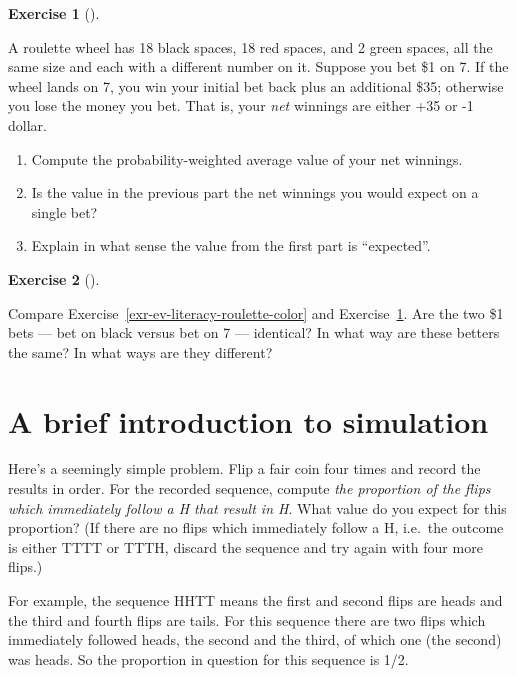 \documentclass[
  letterpaper,
  DIV=11,
  numbers=noendperiod]{scrreprt}
\providecommand{\tightlist}{%
  \setlength{\itemsep}{0pt}\setlength{\parskip}{0pt}}
\theoremstyle{plain}
\theoremstyle{definition}
\theoremstyle{definition}
\newtheorem{exercise}{Exercise}[chapter]
\theoremstyle{definition}
\theoremstyle{remark}
\begin{document}
\begin{exercise}[]\protect\hypertarget{exr-ev-literacy-roulette-number}{}\label{exr-ev-literacy-roulette-number}

A roulette wheel has 18 black spaces, 18 red spaces, and 2 green spaces,
all the same size and each with a different number on it. Suppose you
bet \$1 on 7. If the wheel lands on 7, you win your initial bet back
plus an additional \$35; otherwise you lose the money you bet. That is,
your \emph{net} winnings are either +35 or -1 dollar.

\begin{enumerate}
\def\labelenumi{\arabic{enumi}.}
\tightlist
\item
  Compute the probability-weighted average value of your net winnings.
\item
  Is the value in the previous part the net winnings you would expect on
  a single bet?
\item
  Explain in what sense the value from the first part is ``expected''.
\end{enumerate}

\end{exercise}

\begin{exercise}[]\protect\hypertarget{exr-ev-literacy-roulette-compare}{}\label{exr-ev-literacy-roulette-compare}

Compare Exercise~\ref{exr-ev-literacy-roulette-color} and
Exercise~\ref{exr-ev-literacy-roulette-number}. Are the two \$1 bets ---
bet on black versus bet on 7 --- identical? In what way are these
betters the same? In what ways are they different?

\end{exercise}

\section{A brief introduction to simulation}\label{sec-sim}

Here's a seemingly simple problem. Flip a fair coin four times and
record the results in order. For the recorded sequence, compute
\emph{the proportion of the flips which immediately follow a H that
result in H}. What value do you expect for this proportion? (If there
are no flips which immediately follow a H, i.e.~the outcome is either
TTTT or TTTH, discard the sequence and try again with four more flips.)

For example, the sequence HHTT means the first and second flips are
heads and the third and fourth flips are tails. For this sequence there
are two flips which immediately followed heads, the second and the
third, of which one (the second) was heads. So the proportion in
question for this sequence is 1/2.
\end{document}
